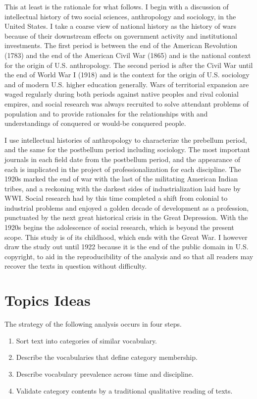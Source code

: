 \documentclass[]{book}
\providecommand{\tightlist}{%
  \setlength{\itemsep}{0pt}\setlength{\parskip}{0pt}}
\begin{document}
This at least is the rationale for what follows. I begin with a
discussion of intellectual history of two social sciences, anthropology
and sociology, in the United States. I take a coarse view of national
history as the history of wars because of their downstream effects on
government activity and institutional investments. The first period is
between the end of the American Revolution (1783) and the end of the
American Civil War (1865) and is the national context for the origin of
U.S. anthropology. The second period is after the Civil War until the
end of World War I (1918) and is the context for the origin of U.S.
sociology and of modern U.S. higher education generally. Wars of
territorial expansion are waged regularly during both periods against
native peoples and rival colonial empires, and social research was
always recruited to solve attendant problems of population and to
provide rationales for the relationships with and understandings of
conquered or would-be conquered people.

I use intellectual histories of anthropology to characterize the
prebellum period, and the same for the postbellum period including
sociology. The most important journals in each field date from the
postbellum period, and the appearance of each is implicated in the
project of professionalization for each discipline. The 1920s marked the
end of war with the last of the militating American Indian tribes, and a
reckoning with the darkest sides of industrialization laid bare by WWI.
Social research had by this time completed a shift from colonial to
industrial problems and enjoyed a golden decade of development as a
profession, punctuated by the next great historical crisis in the Great
Depression. With the 1920s begins the adolescence of social research,
which is beyond the present scope. This study is of its childhood, which
ends with the Great War. I however draw the study out until 1922 because
it is the end of the public domain in U.S. copyright, to aid in the
reproducibility of the analysis and so that all readers may recover the
texts in question without difficulty.

\section{\texorpdfstring{Topics 
Ideas}{Topics  Ideas}}\label{topics-ideas}

The strategy of the following analysis occurs in four steps.

\begin{enumerate}
\def\labelenumi{\arabic{enumi}.}
\tightlist
\item
  Sort text into categories of similar vocabulary.
\item
  Describe the vocabularies that define category membership.
\item
  Describe vocabulary prevalence across time and discipline.
\item
  Validate category contents by a traditional qualitative reading of
  texts.
\end{enumerate}
\end{document}
